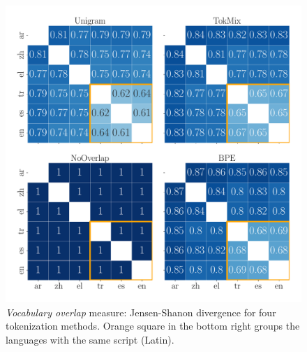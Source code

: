 \begin{figure}[tb!]
    \centering
    \includegraphics[width=\linewidth]{figures/jensehnshannon_d.pdf}
    
    \caption{\emph{Vocabulary overlap} measure: Jensen-Shanon divergence for four tokenization methods. Orange square in the bottom right groups the languages with the same script (Latin).}
    \label{fig:jsd_6l}
\end{figure}